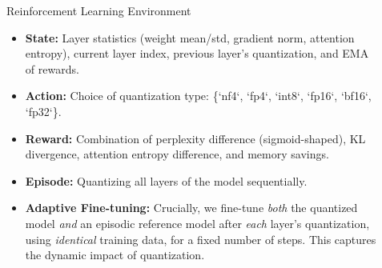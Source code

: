\documentclass[final]{beamer}
\newlength{\sepwidth}
\newlength{\colwidth}
\newcommand{\separatorcolumn}{\begin{column}{\sepwidth}\end{column}}
\begin{document}
\begin{frame}[t]
\begin{columns}[t]
\begin{column}{\colwidth}
\begin{block}{Reinforcement Learning Environment}
					\begin{itemize}
						\item \textbf{State:} Layer statistics (weight mean/std, gradient norm, attention entropy), current layer index, previous layer's quantization, and EMA of rewards.
						\item \textbf{Action:} Choice of quantization type: \{`nf4`, `fp4`, `int8`, `fp16`, `bf16`, `fp32`\}.
						\item \textbf{Reward:} Combination of perplexity difference (sigmoid-shaped), KL divergence, attention entropy difference, and memory savings.
						\item \textbf{Episode:} Quantizing all layers of the model sequentially.
						\item \textbf{Adaptive Fine-tuning:} Crucially, we fine-tune \emph{both} the quantized model \emph{and} an episodic reference model after \emph{each} layer's quantization, using \emph{identical} training data, for a fixed number of steps. This captures the dynamic impact of quantization.
					\end{itemize}
					
				\end{block}
				
			\end{column}
			
			\separatorcolumn
			
			\begin{column}{\colwidth}
				

\end{column}
\end{columns}
\end{frame}
\end{document}
